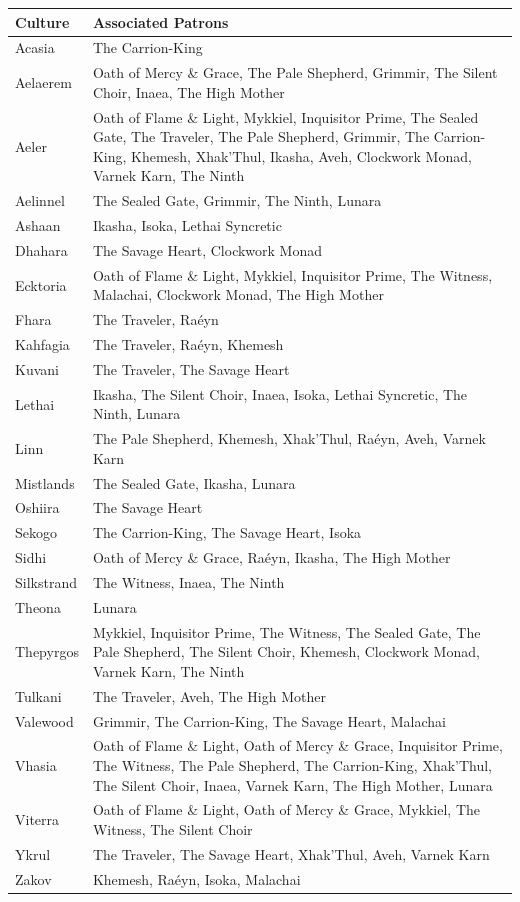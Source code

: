 \begin{longtable}{p{} p{}}
\hline
\textbf{Culture} & \textbf{Associated Patrons} \\
\hline
Acasia & The Carrion-King \\
Aelaerem & Oath of Mercy \& Grace, The Pale Shepherd, Grimmir, The Silent Choir, Inaea, The High Mother \\
Aeler & Oath of Flame \& Light, Mykkiel, Inquisitor Prime, The Sealed Gate, The Traveler, The Pale Shepherd, Grimmir, The Carrion-King, Khemesh, Xhak'Thul, Ikasha, Aveh, Clockwork Monad, Varnek Karn, The Ninth \\
Aelinnel & The Sealed Gate, Grimmir, The Ninth, Lunara \\
Ashaan & Ikasha, Isoka, Lethai Syncretic \\
Dhahara & The Savage Heart, Clockwork Monad \\
Ecktoria & Oath of Flame \& Light, Mykkiel, Inquisitor Prime, The Witness, Malachai, Clockwork Monad, The High Mother \\
Fhara & The Traveler, Raéyn \\
Kahfagia & The Traveler, Raéyn, Khemesh \\
Kuvani & The Traveler, The Savage Heart \\
Lethai & Ikasha, The Silent Choir, Inaea, Isoka, Lethai Syncretic, The Ninth, Lunara \\
Linn & The Pale Shepherd, Khemesh, Xhak'Thul, Raéyn, Aveh, Varnek Karn \\
Mistlands & The Sealed Gate, Ikasha, Lunara \\
Oshiira & The Savage Heart \\
Sekogo & The Carrion-King, The Savage Heart, Isoka \\
Sidhi & Oath of Mercy \& Grace, Raéyn, Ikasha, The High Mother \\
Silkstrand & The Witness, Inaea, The Ninth \\
Theona & Lunara \\
Thepyrgos & Mykkiel, Inquisitor Prime, The Witness, The Sealed Gate, The Pale Shepherd, The Silent Choir, Khemesh, Clockwork Monad, Varnek Karn, The Ninth \\
Tulkani & The Traveler, Aveh, The High Mother \\
Valewood & Grimmir, The Carrion-King, The Savage Heart, Malachai \\
Vhasia & Oath of Flame \& Light, Oath of Mercy \& Grace, Inquisitor Prime, The Witness, The Pale Shepherd, The Carrion-King, Xhak'Thul, The Silent Choir, Inaea, Varnek Karn, The High Mother, Lunara \\
Viterra & Oath of Flame \& Light, Oath of Mercy \& Grace, Mykkiel, The Witness, The Silent Choir \\
Ykrul & The Traveler, The Savage Heart, Xhak'Thul, Aveh, Varnek Karn \\
Zakov & Khemesh, Raéyn, Isoka, Malachai \\
\hline
\end{longtable}

